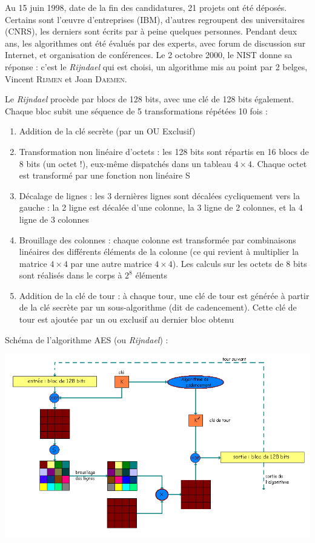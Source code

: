 \documentclass[a4paper,12pt]{article}
\begin{document}
Au 15 juin 1998, date de la fin des candidatures, 21 projets ont été déposés. Certains sont l'\oe{}uvre d'entreprises (IBM), d'autres regroupent des universitaires (CNRS), les derniers sont écrits par à peine quelques personnes. Pendant deux ans, les algorithmes ont été évalués par des experts, avec forum de discussion sur Internet, et organisation de conférences. Le 2 octobre 2000, le NIST donne sa réponse : c'est le \emph{Rijndael} qui est choisi, un algorithme mis au point par 2 belges, Vincent \textsc{Rijmen} et Joan \textsc{Daemen}.

Le \emph{Rijndael} procède par blocs de 128 bits, avec une clé de 128 bits également. Chaque bloc subit une séquence de 5 transformations répétées 10 fois :

\begin{enumerate}
\item Addition de la clé secrète (par un OU Exclusif)
\item Transformation non linéaire d'octets : les 128 bits sont répartis en 16 blocs de 8 bits (un octet !), eux-même dispatchés dans un tableau $4 \times 4$. Chaque octet est transformé par une fonction non linéaire S
\item Décalage de lignes : les 3 dernières lignes sont décalées cycliquement vers la gauche : la 2\ieme{} ligne est décalée d'une colonne, la 3\ieme{} ligne de 2 colonnes, et la 4\ieme{} ligne de 3 colonnes
\item Brouillage des colonnes : chaque colonne est transformée par combinaisons linéaires des différents éléments de la colonne (ce qui revient à multiplier la matrice $4 \times 4$ par une autre matrice $4 \times 4$). Les calculs sur les octets de 8 bits sont réalisés dans le corps à $2^{8}$ éléments
\item Addition de la clé de tour : à chaque tour, une clé de tour est générée à partir de la clé secrète par un sous-algorithme (dit de cadencement). Cette clé de tour est ajoutée par un ou exclusif au dernier bloc obtenu
\end{enumerate}

Schéma de l'algorithme AES (ou \emph{Rijndael}) :

\begin{center}
  \includegraphics[width=\textwidth]{../Image/aes.png}
\end{center}
\end{document}
